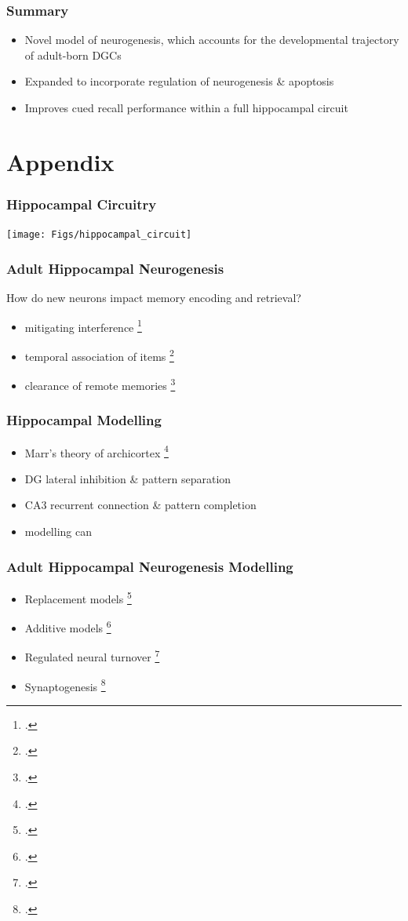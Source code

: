 \documentclass{beamer}
\begin{document}
\begin{frame}
\frametitle{Summary}
\begin{itemize}
\item Novel model of neurogenesis, which accounts for the developmental trajectory of adult-born \ac{DGC}s
\item Expanded to incorporate regulation of neurogenesis \& apoptosis
\item Improves cued recall performance within a full hippocampal circuit
\end{itemize}
\end{frame}

\section*{Appendix}

\begin{frame}
\frametitle{Hippocampal Circuitry}
\center
\texttt{[image: Figs/hippocampal\_circuit]}
\end{frame}

\begin{frame}
\frametitle{Adult Hippocampal Neurogenesis}
How do new neurons impact memory encoding and retrieval?
\begin{itemize}
\item mitigating interference 
\footcite{chambers-potenza-hoffman-miranker-04}
\item temporal association of items \footcite{aimone-wiles-gage-06}
\item clearance of remote memories 
\footcite{deisseroth-singla-toda-monje-palmer-malenka-04}
\end{itemize}
\end{frame}

\begin{frame}
\frametitle{Hippocampal Modelling}
\begin{itemize}
\item Marr's theory of archicortex \footcite{marr-71}
\item \ac{DG} lateral inhibition \& pattern separation
\item CA3 recurrent connection \& pattern completion
\item modelling can 
\end{itemize}
\end{frame}

\begin{frame}
\frametitle{Adult Hippocampal Neurogenesis Modelling}
\begin{itemize}
\item Replacement models \footcite{replacement_neurogenesis}
\item Additive models \footcite{additive_neurogenesis}
\item Regulated neural turnover \footcite{deisseroth-singla-toda-monje-palmer-malenka-04}
\item Synaptogenesis \footcite{butz-et-al-06}
\end{itemize}
\end{frame}
\end{document}
